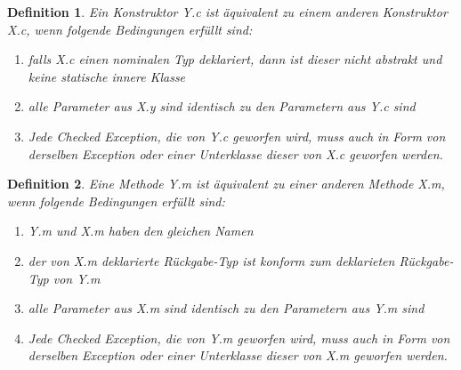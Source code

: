 \documentclass[11pt, 
ngerman,
doublespacing,
chapterinoneline, %
consistentlayout, %
]{scrartcl}
\newtheorem{definition}{Definition}
\begin{document}
\begin{definition}\label{def_equiConstWHITEOAK}
Ein Konstruktor \emph{Y.c} ist äquivalent zu einem anderen Konstruktor \emph{X.c}, wenn folgende Bedingungen erfüllt sind:
\begin{enumerate}
\item falls \emph{X.c} einen nominalen Typ deklariert, dann ist dieser nicht abstrakt und keine statische innere Klasse
\item alle Parameter aus \emph{X.y} sind identisch zu den Parametern aus \emph{Y.c} sind
\item Jede Checked Exception, die von \emph{Y.c} geworfen wird, muss auch in Form von derselben Exception oder einer Unterklasse dieser von \emph{X.c} geworfen werden.
\end{enumerate}
\end{definition}

\begin{definition}\label{def_equiMethWHITEOAK}
Eine Methode \emph{Y.m} ist äquivalent zu einer anderen Methode \emph{X.m}, wenn folgende Bedingungen erfüllt sind:
\begin{enumerate}
\item \emph{Y.m} und \emph{X.m} haben den gleichen Namen
\item der von \emph{X.m} deklarierte Rückgabe-Typ ist konform zum deklarieten Rückgabe-Typ von \emph{Y.m}
\item alle Parameter aus \emph{X.m} sind identisch zu den Parametern aus \emph{Y.m} sind
\item Jede Checked Exception, die von \emph{Y.m} geworfen wird, muss auch in Form von derselben Exception oder einer Unterklasse dieser von \emph{X.m} geworfen werden.

\end{enumerate}
\end{definition}
\end{document}
